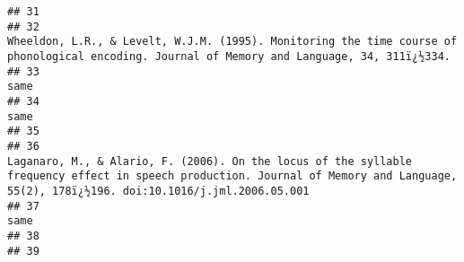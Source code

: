 \documentclass[
  english,
  man]{apa6}
\begin{document}
\begin{verbatim}
## 31                                                                                                                                                                                                                                                                                                                     
## 32                                                                                                                                                                         Wheeldon, L.R., & Levelt, W.J.M. (1995). Monitoring the time course of phonological encoding. Journal of Memory and Language, 34, 311ï¿½334.
## 33                                                                                                                                                                                                                                                                                                                 same
## 34                                                                                                                                                                                                                                                                                                                 same
## 35                                                                                                                                                                                                                                                                                                                     
## 36                                                                                                                               Laganaro, M., & Alario, F. (2006). On the locus of the syllable frequency effect in speech production. Journal of Memory and Language, 55(2), 178ï¿½196. doi:10.1016/j.jml.2006.05.001
## 37                                                                                                                                                                                                                                                                                                                 same
## 38                                                                                                                                                                                                                                                                                                                     
## 39                                                                                                                                                                                                                                                                                                                     

\end{verbatim}
\end{document}
